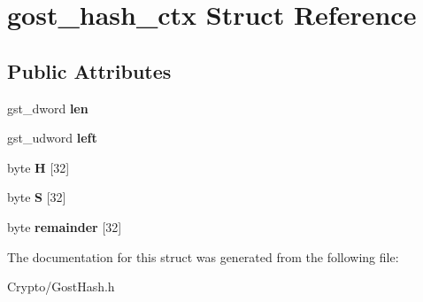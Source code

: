 \hypertarget{structgost__hash__ctx}{}\section{gost\+\_\+hash\+\_\+ctx Struct Reference}
\label{structgost__hash__ctx}
\subsection*{Public Attributes}
\begin{DoxyCompactItemize}
\item 
\mbox{\label{structgost__hash__ctx_ad14406071ca4b99852fb88e5d65123e6}} 
gst\+\_\+dword {\bfseries len}
\item 
\mbox{\label{structgost__hash__ctx_a309911556bbe8b1642c579b014be69ec}} 
gst\+\_\+udword {\bfseries left}
\item 
\mbox{\label{structgost__hash__ctx_accc5677260823458f648359a92c2a091}} 
byte {\bfseries H} \mbox{[}32\mbox{]}
\item 
\mbox{\label{structgost__hash__ctx_a8af839dec073ce4e184e207e54c5cd0c}} 
byte {\bfseries S} \mbox{[}32\mbox{]}
\item 
\mbox{\label{structgost__hash__ctx_a5b529b416db2eba3b46b93081e53d55b}} 
byte {\bfseries remainder} \mbox{[}32\mbox{]}
\end{DoxyCompactItemize}


The documentation for this struct was generated from the following file\+:\begin{DoxyCompactItemize}
\item 
Crypto/Gost\+Hash.\+h\end{DoxyCompactItemize}
